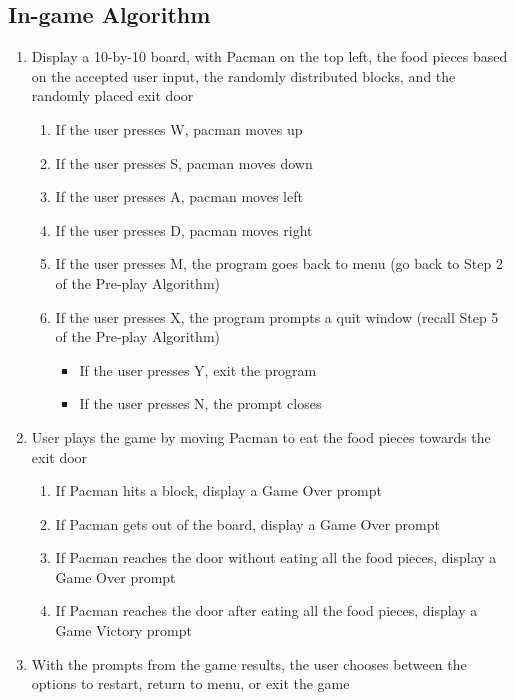 \subsection{In-game Algorithm}

\begin{enumerate}
    \item Display a 10-by-10 board, with Pacman on the top left, the food
        pieces based on the accepted user input, the randomly distributed
        blocks, and the randomly placed exit door
        \begin{enumerate}[label=\alph*]
            \item If the user presses W, pacman moves up
            \item If the user presses S, pacman moves down
            \item If the user presses A, pacman moves left
            \item If the user presses D, pacman moves right
            \item If the user presses M, the program goes back to menu (go back to Step 2 of the Pre-play Algorithm)
            \item If the user presses X, the program prompts a quit window (recall Step 5 of the Pre-play Algorithm)
            \begin{itemize}[label={}]
                \item If the user presses Y, exit the program
                \item If the user presses N, the prompt closes
            \end{itemize}
        \end{enumerate}
    \item User plays the game by moving Pacman to eat the food pieces towards the exit door
        \begin{enumerate}[label=\alph*]
            \item If Pacman hits a block, display a Game Over prompt
            \item If Pacman gets out of the board, display a Game Over prompt
            \item If Pacman reaches the door without eating all the food pieces, display a Game Over prompt
            \item If Pacman reaches the door after eating all the food pieces, display a Game Victory prompt
        \end{enumerate}
    \item With the prompts from the game results, the user chooses between the options to restart, return to menu, or exit the game

\end{enumerate}
